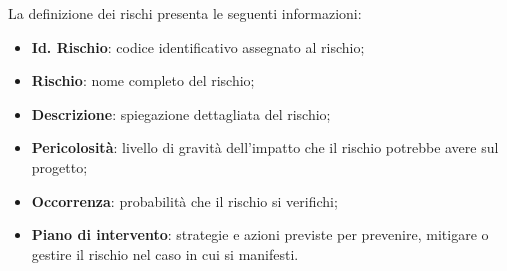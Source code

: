 La definizione dei rischi presenta le seguenti informazioni:
\begin{itemize}
    \item \textbf{Id. Rischio}: codice identificativo assegnato al rischio;
    \item \textbf{Rischio}: nome completo del rischio;
    \item \textbf{Descrizione}: spiegazione dettagliata del rischio;
    \item \textbf{Pericolosità}: livello di gravità dell’impatto che il rischio potrebbe avere sul progetto;
    \item \textbf{Occorrenza}: probabilità che il rischio si verifichi;
    \item \textbf{Piano di intervento}: strategie e azioni previste per prevenire, mitigare o gestire il rischio nel caso in cui si manifesti.
\end{itemize}